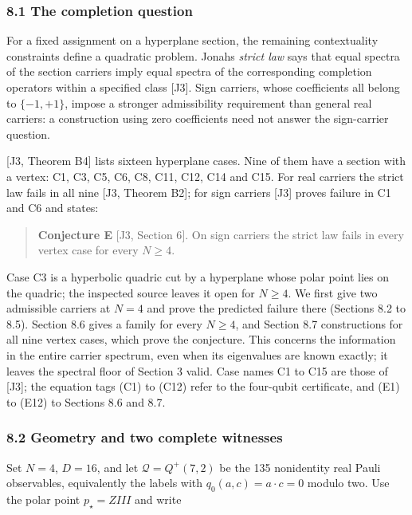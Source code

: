 \documentclass[11pt,a4paper]{article}
\begin{document}
\subsubsection{8.1 The completion question}\label{81-the-completion-question}

For a fixed assignment on a hyperplane section, the remaining contextuality constraints define a
quadratic problem. Jonah\textquotesingle s \emph{strict law} says that equal spectra of the section carriers imply equal
spectra of the corresponding completion operators within a specified class {[}J3{]}. Sign carriers,
whose coefficients all belong to \(\{-1,+1\}\), impose a stronger admissibility requirement than general
real carriers: a construction using zero coefficients need not answer the sign-carrier question.

{[}J3, Theorem B4{]} lists sixteen hyperplane cases. Nine of them have a section with a vertex: C1, C3,
C5, C6, C8, C11, C12, C14 and C15. For real carriers the strict law fails in all nine
{[}J3, Theorem B2{]}; for sign carriers {[}J3{]} proves failure in C1 and C6 and states:

\begin{quote}
\textbf{Conjecture E} {[}J3, Section 6{]}. On sign carriers the strict law fails in every vertex case for every \(N\ge4\).
\end{quote}

Case C3 is a hyperbolic quadric cut by a hyperplane whose polar point lies on the quadric; the
inspected source leaves it open for \(N\ge4\). We first give two admissible carriers at \(N=4\) and prove
the predicted failure there (Sections 8.2 to 8.5). Section 8.6 gives a family for every \(N\ge4\), and
Section 8.7 constructions for all nine vertex cases, which prove the conjecture. This concerns the
information in the entire carrier spectrum, even when its eigenvalues are known exactly; it leaves
the spectral floor of Section 3 valid. Case names C1 to C15 are those of {[}J3{]}; the equation tags
(C1) to (C12) refer to the four-qubit certificate, and (E1) to (E12) to Sections 8.6 and 8.7.

\subsubsection{8.2 Geometry and two complete witnesses}\label{82-geometry-and-two-complete-witnesses}

Set \(N=4\), \(D=16\), and let \(\mathcal Q=Q^+(7,2)\) be the 135 nonidentity real Pauli observables,
equivalently the labels with \(q_0(a,c)=a\cdot c=0\) modulo two. Use the polar point \(p_\star=ZIII\) and
write
\end{document}
